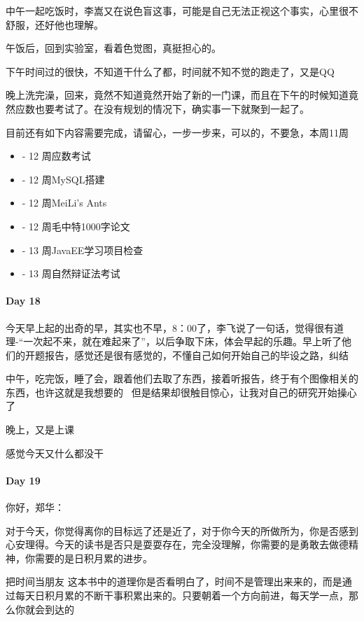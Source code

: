 \documentclass[UTF8,a4paper,8pt]{ctexart}
\begin{document}
 		  中午一起吃饭时，李嵩又在说色盲这事，可能是自己无法正视这个事实，心里很不舒服，还好他也理解。
 		  
 		  午饭后，回到实验室，看着色觉图，真挺担心的。
 		  
 		  下午时间过的很快，不知道干什么了都，时间就不知不觉的跑走了，又是QQ
 		  
 		  晚上洗完澡，回来，竟然不知道竟然开始了新的一门课，而且在下午的时候知道竟然应数也要考试了。在没有规划的情况下，确实事一下就聚到一起了。
 		  
 		  目前还有如下内容需要完成，请留心，一步一步来，可以的，不要急，本周11周
 		   \begin{itemize}[fullwidth,itemindent=2em]
 		   	\item - 12 周应数考试
 		   	\item - 12 周MySQL搭建
 		   	\item - 12 周MeiLi's Ants
 		   	\item - 12 周毛中特1000字论文
 		   	\item - 13 周JavaEE学习项目检查
 		   	\item - 13 周自然辩证法考试
 		   \end{itemize}
 		   
 		   \paragraph{Day 18}
 		   今天早上起的出奇的早，其实也不早，8：00了，李飞说了一句话，觉得很有道理-“一次起不来，就在难起来了”，以后争取下床，体会早起的乐趣。早上听了他们的开题报告，感觉还是很有感觉的，不懂自己如何开始自己的毕设之路，纠结
 		   
 		   中午，吃完饭，睡了会，跟着他们去取了东西，接着听报告，终于有个图像相关的东西，也许这就是我想要的~ 但是结果却很触目惊心，让我对自己的研究开始操心了~
 		   
 		   晚上，又是上课
 		   
 		   感觉今天又什么都没干
 		   
 		  \paragraph{Day 19}
 		  你好，郑华：
 		  
 		  对于今天，你觉得离你的目标远了还是近了，对于你今天的所做所为，你是否感到心安理得。今天的读书是否只是耍耍存在，完全没理解，你需要的是勇敢去做德精神，你需要的是日积月累的进步。
 		  
 		  把时间当朋友 这本书中的道理你是否看明白了，时间不是管理出来来的，而是通过每天日积月累的不断干事积累出来的。只要朝着一个方向前进，每天学一点，那么你就会到达的
 		  
\end{document}

